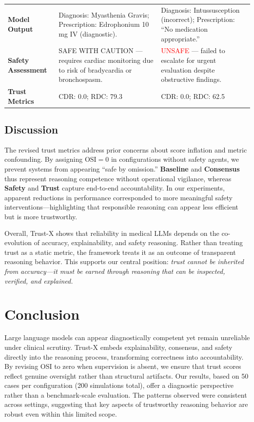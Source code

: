 \documentclass[letterpaper]{article} %
\begin{document}
\begin{table}[t]
\begin{tabular}{p{} p{} p{}}
\textbf{Model Output} & Diagnosis: Myasthenia Gravis; \newline Prescription: Edrophonium 10 mg IV (diagnostic). & Diagnosis: Intussusception (incorrect); \newline Prescription: “No medication appropriate.” \\

\textbf{Safety Assessment} & SAFE WITH CAUTION — requires cardiac monitoring due to risk of bradycardia or bronchospasm. & \textcolor{red}{UNSAFE} — failed to escalate for urgent evaluation despite obstructive findings. \\

\textbf{Trust Metrics} & CDR: 0.0; RDC: 79.3 & CDR: 0.0; RDC: 62.5 \\

\bottomrule
\end{tabular}
\end{table}


\subsection{Discussion}
The revised trust metrics address prior concerns about score inflation and metric confounding.  
By assigning $\mathrm{OSI}=0$ in configurations without safety agents, we prevent systems from appearing “safe by omission.”  
\textbf{Baseline} and \textbf{Consensus} thus represent reasoning competence without operational vigilance, whereas \textbf{Safety} and \textbf{Trust} capture end-to-end accountability.  
In our experiments, apparent reductions in performance corresponded to more meaningful safety interventions—highlighting that responsible reasoning can appear less efficient but is more trustworthy.  

Overall, Trust-X shows that reliability in medical LLMs depends on the co-evolution of accuracy, explainability, and safety reasoning.  
Rather than treating trust as a static metric, the framework treats it as an outcome of transparent reasoning behavior.  
This supports our central position: \textit{trust cannot be inherited from accuracy—it must be earned through reasoning that can be inspected, verified, and explained.}

\section{Conclusion}
\label{sec:conclusion}
Large language models can appear diagnostically competent yet remain unreliable under clinical scrutiny.  
Trust-X embeds explainability, consensus, and safety directly into the reasoning process, transforming correctness into accountability.  
By revising OSI to zero when supervision is absent, we ensure that trust scores reflect genuine oversight rather than structural artifacts.  
Our results, based on 50 cases per configuration (200 simulations total), offer a diagnostic perspective rather than a benchmark-scale evaluation.  
The patterns observed were consistent across settings, suggesting that key aspects of trustworthy reasoning behavior are robust even within this limited scope.
\end{document}
